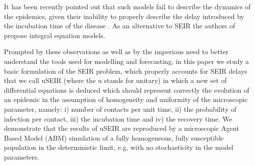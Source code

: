 \documentclass[a4paper,oneside,11pt]{article}
\begin{document}

It has been recently pointed out that such models fail to describe the dynamics of the epidemics, given their inability to properly describe the delay introduced by the incubation time of the disease \cite{fodor2020integral}. As an alternative to SEIR the authors of \cite{fodor2020integral} propose integral equation models. 

Prompted by these observations as well as by the imperious need to better understand the tools used for modelling and forecasting, in this paper we study a basic formulation of the SEIR problem, which properly accounts for SEIR delays that we call uSEIR (where the u stands for unitary) in which a new set of differential equations is deduced which should represent correctly the evolution of an epidemic in the assumption of homogeneity and uniformity of the microscopic parameter, namely: i) number of contacts per unit time, ii) the probability of infection per contact, iii) the incubation time and iv) the recovery time. We demonstrate that the results of uSEIR are reproduced by a microscopic Agent Based Model (ABM) simulation of a fully homogeneous, fully susceptible population in the deterministic limit, e.g, with no stochasticity in the model parameters.
\end{document}
